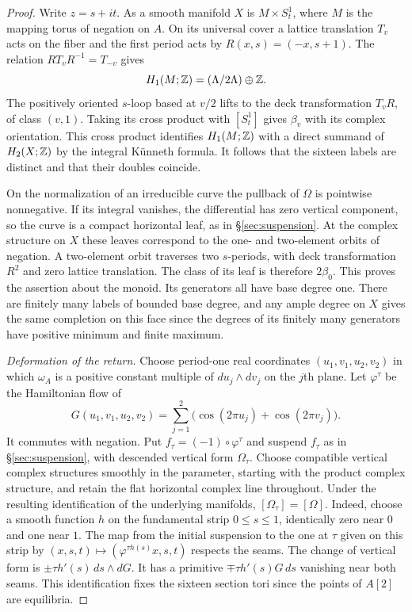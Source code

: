 \begin{proof}
Write $z=s+it$. As a smooth manifold $X$ is $M\times S^1_t$,
where $M$ is the mapping torus of negation on $A$. On its universal
cover a lattice translation $T_v$ acts on the fiber and the first
period acts by $R(x,s)=(-x,s+1)$. The relation
$RT_vR^{-1}=T_{-v}$ gives
\[
 H_1(M;\mathbb Z)=(\Lambda/2\Lambda)\oplus\mathbb Z .
\]
The positively oriented $s$-loop based at $v/2$ lifts to the deck
transformation $T_vR$, of class $(v,1)$. Taking its cross product with
$[S^1_t]$ gives $\beta_v$ with its complex orientation. This cross
product identifies $H_1(M;\mathbb Z)$ with a direct summand of
$H_2(X;\mathbb Z)$ by the integral K\"unneth formula. It follows that the
sixteen labels are distinct and that their doubles coincide.

On the normalization of an irreducible curve the pullback of $\Omega$
is pointwise nonnegative. If its integral vanishes, the differential
has zero vertical component, so the curve is a compact horizontal
leaf, as in \S\ref{sec:suspension}. At the complex structure on $X$
these leaves correspond to the one- and two-element orbits of
negation. A two-element orbit traverses two $s$-periods, with deck
transformation $R^2$ and zero lattice translation. The class of its
leaf is therefore $2\beta_0$. This proves the assertion about the
monoid. Its generators all have base degree one. There are finitely
many labels of bounded base degree, and any ample degree on $X$
gives the same completion on this face since the degrees of its
finitely many generators have positive minimum and finite maximum.

\smallskip
\noindent\emph{Deformation of the return.}
Choose period-one real coordinates $(u_1,v_1,u_2,v_2)$ in which
$\omega_A$ is a positive constant multiple of $du_j\wedge dv_j$
on the $j$th plane. Let $\varphi^\tau$ be the Hamiltonian flow of
\[
 G(u_1,v_1,u_2,v_2)
       =\sum_{j=1}^2\bigl(\cos(2\pi u_j)+\cos(2\pi v_j)\bigr).
\]
It commutes with negation. Put $f_\tau=(-1)\circ\varphi^\tau$
and suspend $f_\tau$ as in \S\ref{sec:suspension}, with descended
vertical form $\Omega_\tau$. Choose compatible vertical complex
structures smoothly in the parameter, starting with the product
complex structure, and retain the flat horizontal complex line
throughout. Under the resulting identification of the underlying
manifolds, $[\Omega_\tau]=[\Omega]$. Indeed, choose a smooth
function $h$ on the fundamental strip $0\le s\le1$, identically zero
near $0$ and one near $1$. The map from the initial suspension to the
one at $\tau$ given on this strip by
$(x,s,t)\mapsto(\varphi^{\tau h(s)}x,s,t)$ respects the seams.
The change of vertical form is $\pm\tau h'(s)\,ds\wedge dG$.
It has a primitive $\mp\tau h'(s)G\,ds$ vanishing near both seams.
This identification fixes the sixteen section tori since the points
of $A[2]$ are equilibria.


\end{proof}
